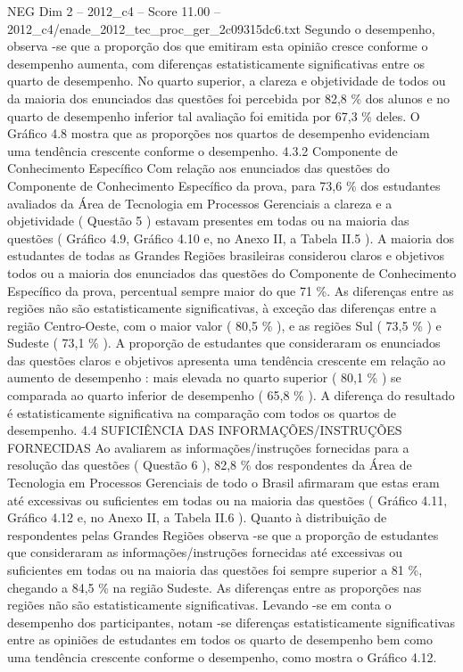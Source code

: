\begin{textsample}{NEG Dim 2 – 2012\_c4 – Score 11.00 – 2012\_c4/enade\_2012\_tec\_proc\_ger\_2c09315dc6.txt}
Segundo o desempenho, observa -se que a proporção dos que emitiram esta opinião cresce conforme o desempenho aumenta, com diferenças estatisticamente significativas entre os quarto de desempenho.
No quarto superior, a clareza e objetividade de todos ou da maioria dos enunciados das questões foi percebida por 82,8 \% dos alunos e no quarto de desempenho inferior tal avaliação foi emitida por 67,3 \% deles.
O Gráfico 4.8 mostra que as proporções nos quartos de desempenho evidenciam uma tendência crescente conforme o desempenho. 4.3.2 Componente de Conhecimento Específico Com relação aos enunciados das questões do Componente de Conhecimento Específico da prova, para 73,6 \% dos estudantes avaliados da Área de Tecnologia em Processos Gerenciais a clareza e a objetividade ( Questão 5 ) estavam presentes em todas ou na maioria das questões ( Gráfico 4.9, Gráfico 4.10 e, no Anexo II, a Tabela II.5 ).
A maioria dos estudantes de todas as Grandes Regiões brasileiras considerou claros e objetivos todos ou a maioria dos enunciados das questões do Componente de Conhecimento Específico da prova, percentual sempre maior do que 71 \%.
As diferenças entre as regiões não são estatisticamente significativas, à exceção das diferenças entre a região Centro-Oeste, com o maior valor ( 80,5 \% ), e as regiões Sul ( 73,5 \% ) e Sudeste ( 73,1 \% ).
A proporção de estudantes que consideraram os enunciados das questões claros e objetivos apresenta uma tendência crescente em relação ao aumento de desempenho : mais elevada no quarto superior ( 80,1 \% ) se comparada ao quarto inferior de desempenho ( 65,8 \% ).
A diferença do resultado é estatisticamente significativa na comparação com todos os quartos de desempenho. 4.4 SUFICIÊNCIA DAS INFORMAÇÕES/INSTRUÇÕES FORNECIDAS Ao avaliarem as informações/instruções fornecidas para a resolução das questões ( Questão 6 ), 82,8 \% dos respondentes da Área de Tecnologia em Processos Gerenciais de todo o Brasil afirmaram que estas eram até excessivas ou suficientes em todas ou na maioria das questões ( Gráfico 4.11, Gráfico 4.12 e, no Anexo II, a Tabela II.6 ).
Quanto à distribuição de respondentes pelas Grandes Regiões observa -se que a proporção de estudantes que consideraram as informações/instruções fornecidas até excessivas ou suficientes em todas ou na maioria das questões foi sempre superior a 81 \%, chegando a 84,5 \% na região Sudeste.
As diferenças entre as proporções nas regiões não são estatisticamente significativas.
Levando -se em conta o desempenho dos participantes, notam -se diferenças estatisticamente significativas entre as opiniões de estudantes em todos os quarto de desempenho bem como uma tendência crescente conforme o desempenho, como mostra o Gráfico 4.12.

\end{textsample}
